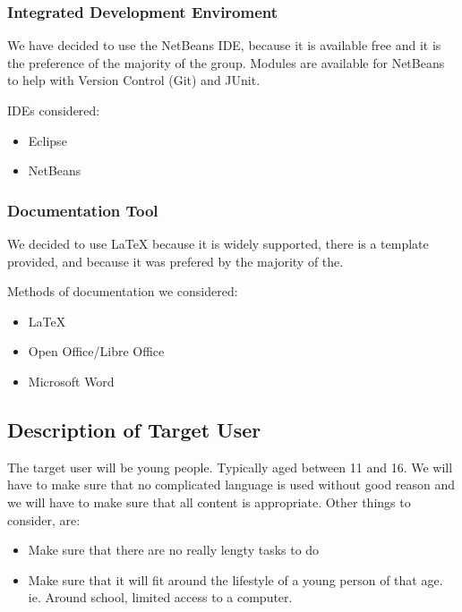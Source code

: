 \documentclass{article}
\begin{document}
\subsubsection{Integrated Development Enviroment}
We have decided to use the NetBeans IDE, because it is available free
and it is the preference of the majority of the group. Modules are
available for NetBeans to help with Version Control (Git) and JUnit.

IDEs considered:
\begin{itemize}
	\item{Eclipse}
	\item{NetBeans}
\end{itemize}

\subsubsection{Documentation Tool}
We decided to use \LaTeX{} because it is widely supported, there is a
template provided, and because it was prefered by the majority of the.

Methods of documentation we considered:
\begin{itemize}
	\item{\LaTeX{}}
	\item{Open Office/Libre Office}
	\item{Microsoft Word}
\end{itemize}


\subsection{Description of Target User}
The target user will be young people. Typically aged between 11 and 16.
We will have to make sure that no complicated language is used without good
reason and we will have to make sure that all content is appropriate. Other
things to consider, are:
\begin{itemize}
	\item{Make sure that there are no really lengty tasks to do}
	\item{Make sure that it will fit around the lifestyle of a young
		person of that age. ie. Around school, limited access
		to a computer.}
\end{itemize}
\end{document}
